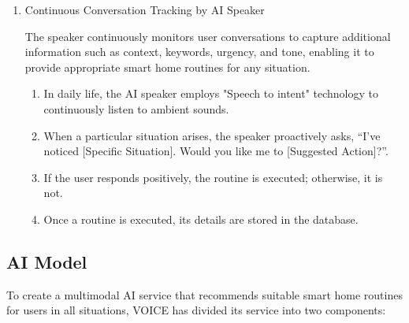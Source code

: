 \documentclass[conference]{IEEEtran}
\begin{document}
\begin{enumerate}[label=\arabic*]
    \vspace{1em}

    \item Continuous Conversation Tracking by AI Speaker\par
    \vspace{0.3em}
    The speaker continuously monitors user conversations to capture additional information such as context, keywords, urgency, and tone, enabling it to provide appropriate smart home routines for any situation.
    \vspace{0.3em}

    \begin{enumerate}[label=\arabic*)]
        \item In daily life, the AI speaker employs "Speech to intent" technology to continuously listen to ambient sounds. 

        \vspace{0.5em}

        \item When a particular situation arises, the speaker proactively asks, “I've noticed [Specific Situation]. Would you like me to [Suggested Action]?”.

        \vspace{0.5em}

        \item If the user responds positively, the routine is executed; otherwise, it is not.

        \vspace{0.5em}

        \item Once a routine is executed, its details are stored in the database.
    \end{enumerate}
\end{enumerate}

\vspace{0.7em} %

\subsection{AI Model}
To create a multimodal AI service that recommends suitable smart home routines for users in all situations, VOICE has divided its service into two components:
\vspace{0.5em}
\end{document}

